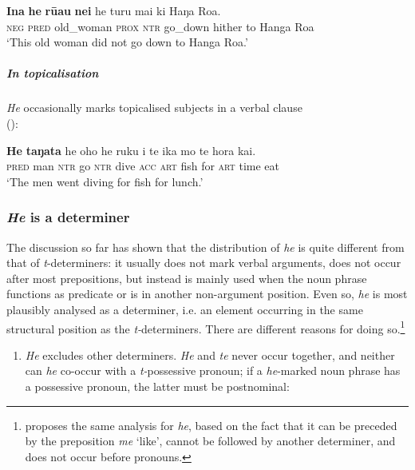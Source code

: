 \ea\label{ex:5.48}
\gll \textbf{{\ꞌ}Ina} \textbf{he} \textbf{rū{\ꞌ}au} \textbf{nei} he turu mai ki Haŋa Roa. \\
\textsc{neg} \textsc{pred} old\_woman \textsc{prox} \textsc{ntr} go\_down hither to Hanga Roa \\

\glt 
‘This old woman did not go down to Hanga Roa.’ \textstyleExampleref{[R380.006]} 
\z

\subparagraph{In topicalisation} \textit{He} occasionally marks topicalised subjects in a verbal clause\\ ():

\ea\label{ex:5.49}
\gll \textbf{He} \textbf{taŋata} he oho he ruku i te ika mo te hora kai. \\
\textsc{pred} man \textsc{ntr} go \textsc{ntr} dive \textsc{acc} \textsc{art} fish for \textsc{art} time eat \\

\glt 
‘The men went diving for fish for lunch.’ \textstyleExampleref{[R183.019]} 
\z

\subsubsection{\textit{He} is a determiner}\label{sec:5.3.4.2}

The discussion so far has shown that the distribution of \textit{he} is quite different from that of \textit{t}{}-determiners: it usually does not mark verbal arguments, does not occur after most prepositions, but instead is mainly used when the noun phrase functions as predicate or is in another non-argument position. Even so, \textit{he} is most plausibly analysed as a determiner, i.e. an element occurring in the same structural position as the \textit{t-}determiners. There are different reasons for doing so.\footnote{\label{fn:257}\citet{Cook1999} proposes the same analysis for  \textit{he}, based on the fact that it can be preceded by the preposition \textit{me} ‘like’, cannot be followed by another determiner, and does not occur before pronouns.} 

\begin{enumerate}
\item
\textit{He} excludes other determiners. \textit{He} and \textit{te} never occur together, and neither can \textit{he} co-occur with a \textit{t-}possessive pronoun; if a \textit{he}{}-marked noun phrase has a possessive pronoun, the latter must be postnominal:
\end{enumerate}

